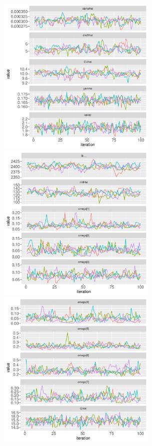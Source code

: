 \documentclass[10pt, reqno, oneside]{amsbook}
\numberwithin{equation}{chapter}
\numberwithin{figure}{chapter}
\numberwithin{table}{chapter}
\theoremstyle{remark}
\begin{document}
\begin{figure}[htbp]
\includegraphics[width=3.0in,trim=0in 0in 0 0in]{graphics/neutropenia_0.82/neutropeniaPopulationPlots001.pdf}
\includegraphics[width=3.0in,trim=0in 0in 0 0in]{graphics/neutropenia_0.82/neutropeniaPopulationPlots002.pdf}
\includegraphics[width=3.0in,trim=0in 0in 0 0in]{graphics/neutropenia_0.82/neutropeniaPopulationPlots003.pdf}

\end{figure}
\end{document}

